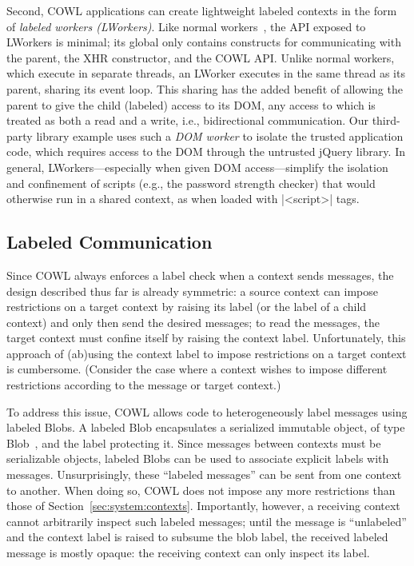 Second, COWL applications can create lightweight labeled contexts in
the form of \emph{labeled workers (LWorkers)}.
%
Like normal workers~\cite{workers}, the API exposed to LWorkers is
minimal; its global only contains constructs for communicating
with the parent, the XHR constructor, and the COWL API.
%
Unlike normal workers, which execute in separate threads, an LWorker
executes in the same thread as its parent, sharing its event loop.
%
This sharing has the added benefit of allowing the parent to give the
child (labeled) access to its DOM, any access to which is treated as
both a read and a write, i.e., bidirectional communication.
%
Our third-party library example uses such a \emph{DOM worker} to
isolate the trusted application code, which requires access to the DOM
through the untrusted jQuery library.
%
In general, LWorkers---especially when given DOM access---simplify the
isolation and confinement of scripts (e.g., the password strength
checker) that would otherwise run in a shared context, as when loaded
with \js|<script>| tags.


\subsection{Labeled Communication}
\label{sec:system:communication}
Since COWL always enforces a label check when a context sends
messages, the design described thus far is already symmetric: a source
context can impose restrictions on a target context by raising its
label (or the label of a child context) and only then send the desired
messages; to read the messages, the target context must confine itself
by raising the context label.
%
Unfortunately, this approach of (ab)using the context label to impose
restrictions on a target context is cumbersome.
%
(Consider the case where a context wishes to impose different
restrictions according to the message or target context.)

To address this issue, COWL allows code to heterogeneously label
messages using labeled Blobs.
%
A labeled Blob encapsulates a serialized immutable object, of type
Blob~\cite{html5}, and the label protecting it.
%
Since messages between contexts must be serializable objects, labeled
Blobs can be used to associate explicit labels with messages.
%
Unsurprisingly, these ``labeled messages'' can be sent from one
context to another.
%
When doing so, COWL does not impose any more restrictions than those of
Section~\ref{sec:system:contexts}.
%
Importantly, however, a receiving context cannot arbitrarily inspect
such labeled messages;
%
until the message is ``unlabeled'' and the context label is raised to
subsume the blob label, the received labeled message is mostly opaque:
the receiving context can only inspect its label.

